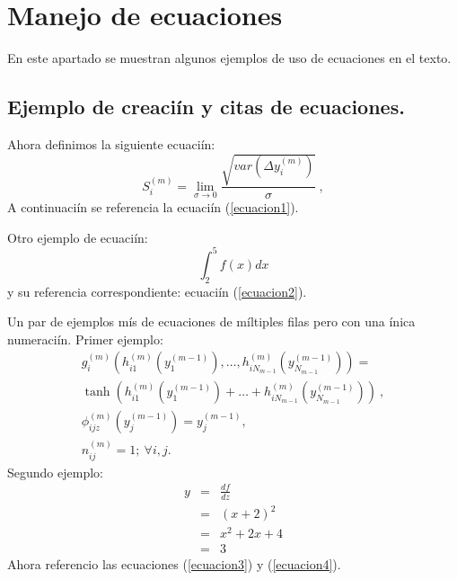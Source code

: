 \chapter{Manejo de ecuaciones}

En este apartado se muestran algunos ejemplos de uso de ecuaciones en el texto.

\section{Ejemplo de creaciín y citas de ecuaciones.}

Ahora definimos la siguiente ecuaciín:
\begin{equation}
S_i^{(m)} = \lim \limits_{\sigma \rightarrow 0
}\frac{\sqrt{var(\Delta y_i^{(m)})}}{\sigma} \ ,
\label{ecuacion1}
\end{equation}
A continuaciín se referencia la ecuaciín (\ref{ecuacion1}).

Otro ejemplo de ecuaciín:
\begin{equation}
\int_{2}^{5} f(x) dx
\label{ecuacion2}
\end{equation}
y su referencia correspondiente: ecuaciín (\ref{ecuacion2}).

Un par de ejemplos mís de ecuaciones de míltiples filas pero con una ínica numeraciín. Primer ejemplo:
%
\begin{equation}
\begin{array}{c}
g_i^{(m)}(h_{i1}^{(m)}(y_{1}^{(m-1)}),\dots,h_{iN_{m-1}}^{(m)}(y_{N_{m-1}}^{(m-1 )})) =
\\[0.3cm]%
\tanh (h_{i1}^{(m)}(y_{1}^{(m-1)}) + \dots + h_{iN_{m-1}}^{(m)}(y_{N_{m-1}}^{(m-1)})) \ ,
\\[0.3cm]%
\phi_{ijz}^{(m)}(y_j^{(m-1)}) = y_j^{(m-1)},
\\[0.3cm]%
n_{ij}^{(m)} = 1; \ \forall i,j.
\end{array}
\label{ecuacion3}
\end{equation}
%
Segundo ejemplo:
%
\begin{equation}
\begin{array}{rcl}
y & = & {\displaystyle \frac{df}{dz}} \\
  & = & (x + 2)^2                     \\
  & = & x^2 + 2x + 4                  \\
  & = & 3
\end{array}
\label{ecuacion4}
\end{equation}
%
Ahora referencio las ecuaciones (\ref{ecuacion3}) y (\ref{ecuacion4}).

